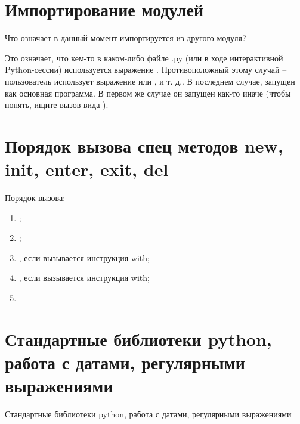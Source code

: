 \section{Импортирование модулей}
Что означает  в данный момент импортируется из другого модуля?

Это означает, что кем-то в каком-либо файле .py (или в ходе интерактивной Python-сессии) используется выражение . Противоположный этому случай – пользователь использует выражение  или , и т. д.. В последнем случае,  запущен как основная программа. В первом же случае он запущен как-то иначе (чтобы понять, ищите вызов вида ).

\section{Порядок вызова спец методов new, init, enter, exit, del}

Порядок вызова:

\begin{enumerate}
	\item {};
	\item {};
	\item {}, если вызывается инструкция with;
	\item {}, если вызывается инструкция with;
	\item {}
\end{enumerate}

\section{Стандартные библиотеки python, работа с датами, регулярными выражениями}

Стандартные библиотеки python, работа с датами, регулярными выражениями

